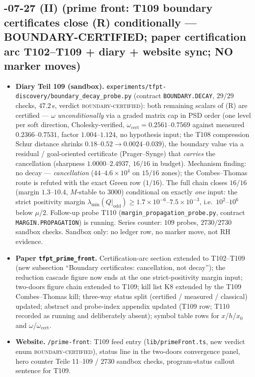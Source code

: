 \documentclass[11pt]{article}
\begin{document}
\subsection*{-07-27 (II) (prime front: T109 boundary certificates close (R) conditionally --- BOUNDARY-CERTIFIED; paper certification arc T102--T109 + diary + website sync; NO marker moves)}
\begin{itemize}[leftmargin=1.5em]
\item \textbf{Diary Teil 109 (sandbox).} \texttt{experiments/tfpt-discovery/boundary\_decay\_probe.py}
(contract \texttt{BOUNDARY.DECAY}, $29/29$ checks, $47.2$\,s, verdict \textsc{boundary-certified}):
both remaining scalars of (R) are certified --- $\omega$ \emph{unconditionally} via a graded matrix
cap in PSD order (one level per soft direction, Cholesky-verified,
$\omega_{\mathrm{cert}}=0.2561$--$0.7569$ against measured $0.2366$--$0.7531$, factor
$1.004$--$1.124$, no hypothesis input; the T108 compression Schur distance shrinks
$0.18$--$0.52\to0.0024$--$0.039$), the boundary value via a residual / goal-oriented certificate
(Prager--Synge) that \emph{carries} the cancellation (sharpness $1.0000$--$2.4937$, $16/16$ in
budget). Mechanism finding: no decay --- \emph{cancellation} ($44$--$4.6\times10^{4}$ on $15/16$
zones); the Combes--Thomas route is refuted with the exact Green row ($1/16$). The full chain closes
$16/16$ (margin $1.3$--$10.4$, $M$-stable to $3000$) conditional on exactly \emph{one} input: the
strict positivity margin $\lambda_{\min}(Q|_{\mathrm{odd}})\ge1.7\times10^{-6}$--$7.5\times10^{-3}$,
i.e.\ $10^{2}$--$10^{6}$ below $\mu/2$. Follow-up probe T110
(\texttt{margin\_propagation\_probe.py}, contract \texttt{MARGIN.PROPAGATION}) is running. Series
counter: $109$ probes, $2730/2730$ sandbox checks. Sandbox only: no ledger row, no marker move, not
RH evidence.
\item \textbf{Paper \texttt{tfpt\_prime\_front}.} Certification-arc section extended to T102--T109
(new subsection ``Boundary certificates: cancellation, not decay''); the reduction cascade figure now
ends at the one strict-positivity margin input; two-doors figure chain extended to T109; kill list K8
extended by the T109 Combes--Thomas kill; three-way status split (certified / measured / classical)
updated; abstract and probe-index appendix updated (T109 row; T110 recorded as running and
deliberately absent); symbol table rows for $x$/$h$/$x_0$ and $\omega$/$\omega_{\mathrm{cert}}$.
\item \textbf{Website.} \texttt{/prime-front}: T109 feed entry (\texttt{lib/primeFront.ts}, new
verdict enum \textsc{boundary-certified}), status line in the two-doors convergence panel, hero
counter Teile 11--109 / $2730$ sandbox checks, program-status callout sentence for T109.
\end{itemize}
\end{document}
